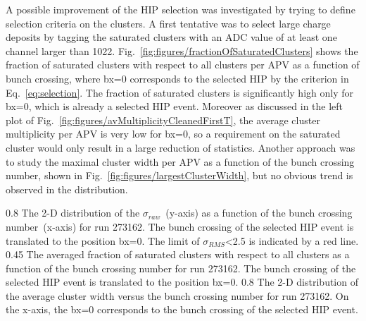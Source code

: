 
A possible improvement of the HIP selection was investigated by trying to define selection criteria on the clusters. A first tentative was to select large charge deposits by tagging the saturated clusters with an ADC value of at least one channel larger than 1022. Fig.~\ref{fig:figures/fractionOfSaturatedClusters} shows the fraction of saturated clusters with respect to all clusters per APV as a function of bunch crossing, where bx=0 corresponds to the selected HIP by the criterion in Eq.~\ref{eq:selection}. The fraction of saturated clusters is significantly high only for bx=0, which is already a selected HIP event. Moreover as discussed in the left plot of Fig.~\ref{fig:figures/avMultiplicityCleanedFirstT}, the average cluster multiplicity per APV is very low for bx=0, so a requirement on the saturated cluster would only result in a large reduction of statistics. Another approach was to study the maximal cluster width per APV as a function of the bunch crossing number, shown in Fig.~\ref{fig:figures/largestClusterWidth}, but no obvious trend is observed in the distribution. 

                 {0.8}       %
                 {The 2-D distribution of the $\sigma_{raw}$~(y-axis) as a function of the bunch crossing number~(x-axis) for run 273162. The bunch crossing of the selected HIP event is translated to the position bx=0. The limit of $\sigma_{RMS}$<2.5 is indicated by a red line. } %
                 {0.45}       %
                 {The averaged fraction of saturated clusters with respect to all clusters as a function of the bunch crossing  number for run 273162. The bunch crossing of the selected HIP event is translated to the position bx=0. } %
                 {0.8}       %
                 {The 2-D distribution of the average cluster width versus the bunch crossing number for run 273162. On the x-axis, the bx=0 corresponds to the bunch crossing of the selected HIP event.} %

